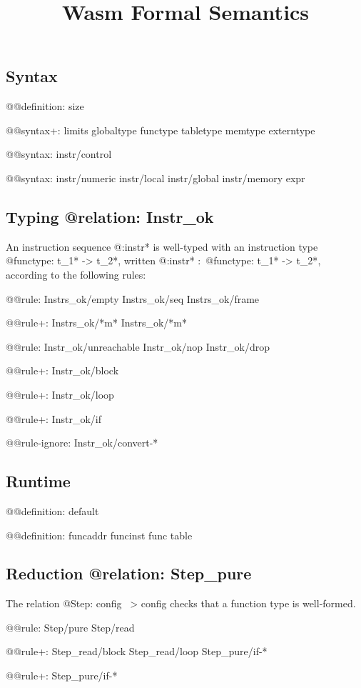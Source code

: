 \documentclass[a4paper]{scrartcl}
\title{Wasm Formal Semantics}
\begin{document}
\small

\maketitle


\subsection*{Syntax}

@@{definition: size}

@@{syntax+:
  limits
  {globaltype
  functype
  tabletype
  memtype}
  {}
  externtype
}

@@{syntax: {instr/control}}

@@{syntax: {instr/numeric instr/local instr/global instr/memory} expr}


\subsection*{Typing @{relation: Instr_ok}}

An instruction sequence @{:instr*} is well-typed with an instruction type @{functype: t_1* -> t_2*}, written @{:instr*} $:$ @{functype: t_1* -> t_2*}, according to the following rules:

@@{rule:
  {Instrs_ok/empty Instrs_ok/seq}
  {Instrs_ok/frame}
}

@@{rule+: Instrs_ok/*m* {Instrs_ok/*m*}}

@@{rule: {Instr_ok/unreachable Instr_ok/nop Instr_ok/drop}}

@@{rule+: Instr_ok/block}

@@{rule+: Instr_ok/loop}

@@{rule+: Instr_ok/if}


@@{rule-ignore: Instr_ok/convert-*}


\subsection*{Runtime}

@@{definition: default}

@@{definition: {funcaddr funcinst} {func table}}


\subsection*{Reduction @{relation: Step_pure}}

The relation @{Step: config ~> config} checks that a function type is well-formed.

@@{rule: Step/pure Step/read}

@@{rule+: {Step_read/block Step_read/loop} {Step_pure/if-*}}

@@{rule+: Step_pure/if-*}
\end{document}
